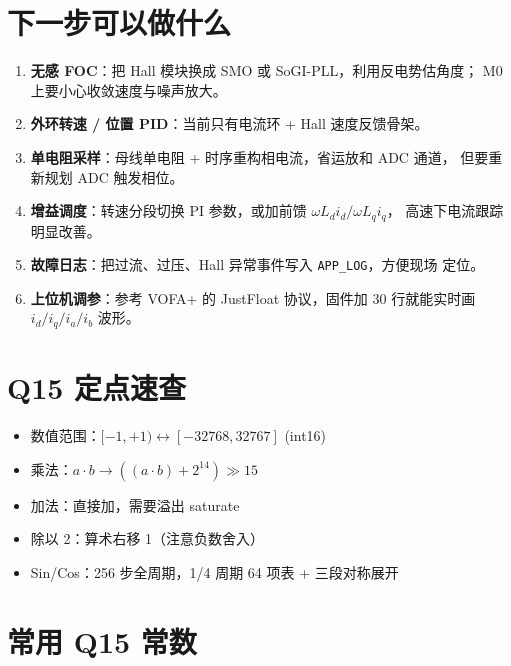 \documentclass[UTF8,a4paper,11pt]{ctexart}
\newcommand{\code}[1]{\texttt{#1}}
\begin{document}
\section{下一步可以做什么}

\begin{enumerate}
  \item \textbf{无感 FOC}：把 Hall 模块换成 SMO 或 SoGI-PLL，利用反电势估角度；
        M0 上要小心收敛速度与噪声放大。
  \item \textbf{外环转速 / 位置 PID}：当前只有电流环 + Hall 速度反馈骨架。
  \item \textbf{单电阻采样}：母线单电阻 + 时序重构相电流，省运放和 ADC 通道，
        但要重新规划 ADC 触发相位。
  \item \textbf{增益调度}：转速分段切换 PI 参数，或加前馈 $\omega L_d i_d / \omega L_q i_q$，
        高速下电流跟踪明显改善。
  \item \textbf{故障日志}：把过流、过压、Hall 异常事件写入 \code{APP\_LOG}，方便现场
        定位。
  \item \textbf{上位机调参}：参考 VOFA+ 的 JustFloat 协议，固件加 30 行就能实时画
        $i_d/i_q/i_a/i_b$ 波形。
\end{enumerate}

\appendix
\section{Q15 定点速查}

\begin{itemize}
  \item 数值范围：$[-1, +1) \leftrightarrow [-32768, 32767]$ (int16)
  \item 乘法：$a \cdot b \to ((a \cdot b) + 2^{14}) \gg 15$
  \item 加法：直接加，需要溢出 saturate
  \item 除以 2：算术右移 1（注意负数舍入）
  \item Sin/Cos：256 步全周期，1/4 周期 64 项表 + 三段对称展开
\end{itemize}

\section{常用 Q15 常数}
\end{document}
